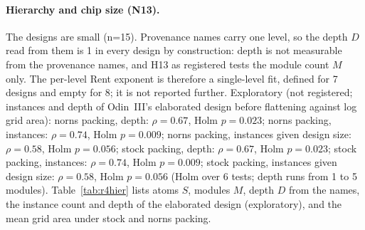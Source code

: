 \paragraph{Hierarchy and chip size (N13).} The designs are small (n=15). Provenance names carry one  level, so the depth $D$ read from them is 1 in every design by construction: depth is not measurable from the provenance names, and H13 as registered tests the module count $M$ only. The per-level Rent exponent is therefore a single-level fit, defined for 7 designs and empty for 8; it is not reported further. Exploratory (not registered; instances and depth of Odin~III's elaborated design before flattening against log grid area): norns packing, depth: $\rho=0.67$, Holm $p=0.023$; norns packing, instances: $\rho=0.74$, Holm $p=0.009$; norns packing, instances given design size: $\rho=0.58$, Holm $p=0.056$; stock packing, depth: $\rho=0.67$, Holm $p=0.023$; stock packing, instances: $\rho=0.74$, Holm $p=0.009$; stock packing, instances given design size: $\rho=0.58$, Holm $p=0.056$ (Holm over 6 tests; depth runs from 1 to 5 modules).
Table~\ref{tab:r4hier} lists atoms $S$, modules $M$, depth $D$ from the names, the instance count and depth of the elaborated design (exploratory), and the mean grid area under stock and norns packing.
